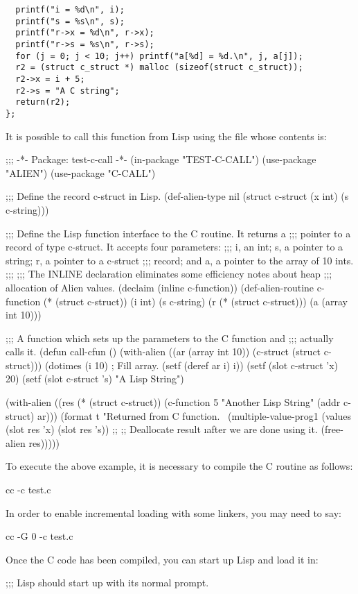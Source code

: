{\begin{verbatim}
  printf("i = %d\n", i);
  printf("s = %s\n", s);
  printf("r->x = %d\n", r->x);
  printf("r->s = %s\n", r->s);
  for (j = 0; j < 10; j++) printf("a[%d] = %d.\n", j, a[j]);
  r2 = (struct c_struct *) malloc (sizeof(struct c_struct));
  r2->x = i + 5;
  r2->s = "A C string";
  return(r2);
};
\end{verbatim}
It is possible to call this function from Lisp using the file 
whose contents is:
\begin{lisp}
;;; -*- Package: test-c-call -*-
(in-package "TEST-C-CALL")
(use-package "ALIEN")
(use-package "C-CALL")

;;; Define the record c-struct in Lisp.
(def-alien-type nil
    (struct c-struct
	    (x int)
	    (s c-string)))

;;; Define the Lisp function interface to the C routine.  It returns a
;;; pointer to a record of type c-struct.  It accepts four parameters:
;;; i, an int; s, a pointer to a string; r, a pointer to a c-struct
;;; record; and a, a pointer to the array of 10 ints.
;;;
;;; The INLINE declaration eliminates some efficiency notes about heap
;;; allocation of Alien values.
(declaim (inline c-function))
(def-alien-routine c-function
    (* (struct c-struct))
  (i int)
  (s c-string)
  (r (* (struct c-struct)))
  (a (array int 10)))

;;; A function which sets up the parameters to the C function and
;;; actually calls it.
(defun call-cfun ()
  (with-alien ((ar (array int 10))
	       (c-struct (struct c-struct)))
    (dotimes (i 10)                     ; Fill array.
      (setf (deref ar i) i))
    (setf (slot c-struct 'x) 20)
    (setf (slot c-struct 's) "A Lisp String")

    (with-alien ((res (* (struct c-struct))
		      (c-function 5 "Another Lisp String" (addr c-struct) ar)))
      (format t "Returned from C function.~%
      (multiple-value-prog1
	  (values (slot res 'x)
		  (slot res 's))
	;;		
	;; Deallocate result \i{after} we are done using it.
	(free-alien res)))))
\end{lisp}
To execute the above example, it is necessary to compile the C routine as
follows:
\begin{example}
cc -c test.c
\end{example}
In order to enable incremental loading with some linkers, you may need to say:
\begin{example}
cc -G 0 -c test.c
\end{example}
Once the C code has been compiled, you can start up Lisp and load it in:
\begin{example}
;;; Lisp should start up with its normal prompt.


\end{example}}
